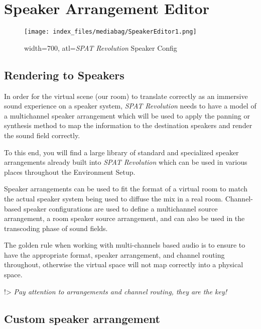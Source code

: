 \documentclass[
  letterpaper,
  DIV=11,
  numbers=noendperiod]{scrreport}
\begin{document}
\hypertarget{speaker-arrangement-editor}{%
\chapter{Speaker Arrangement Editor}\label{speaker-arrangement-editor}}

\begin{figure}

{\centering \texttt{[image: index\_files/mediabag/SpeakerEditor1.png]}

}

\caption{width=700, atl=\emph{SPAT Revolution} Speaker Config}

\end{figure}

\hypertarget{rendering-to-speakers}{%
\section{Rendering to Speakers}\label{rendering-to-speakers}}

In order for the virtual scene (our room) to translate correctly as an
immersive sound experience on a speaker system, \emph{SPAT Revolution}
needs to have a model of a multichannel speaker arrangement which will
be used to apply the panning or synthesis method to map the information
to the destination speakers and render the sound field correctly.

To this end, you will find a large library of standard and specialized
speaker arrangements already built into \emph{SPAT Revolution} which can
be used in various places throughout the Environment Setup.

Speaker arrangements can be used to fit the format of a virtual room to
match the actual speaker system being used to diffuse the mix in a real
room. Channel-based speaker configurations are used to define a
multichannel source arrangement, a room speaker source arrangement, and
can also be used in the transcoding phase of sound fields.

The golden rule when working with multi-channels based audio is to
ensure to have the appropriate format, speaker arrangement, and channel
routing throughout, otherwise the virtual space will not map correctly
into a physical space.

!\textgreater{} \emph{Pay attention to arrangements and channel routing,
they are the key!}

\hypertarget{custom-speaker-arrangement}{%
\section{Custom speaker arrangement}\label{custom-speaker-arrangement}}
\end{document}
